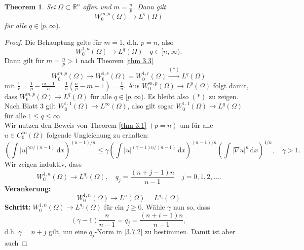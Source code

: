 \documentclass[
paper=a4,
bibtotocnumbered,
liststotocnumbered,
tablecaptionabove,
pointlessnumbers,
twoside,
openright,
10pt
]
{report}
\newtheorem{thm}{Theorem}[chapter]
\theoremstyle{definition}
\numberwithin{equation}{chapter}
\begin{document}
\begin{thm}\label{3.7}
 Sei $\Omega\subset \mathbb R^n$ offen und $m=\frac{n}{p}$. Dann gilt
 \begin{equation}
  W_0^{m,p}(\Omega) \to L^q(\Omega)
 \end{equation}
 für alle $q\in [p,\infty)$.
\end{thm}
\begin{proof}
 Die Behauptung gelte für $m=1$, d.h. $p=n$, also
 \begin{equation}\label{3.7.1}
  W_0^{1,n}(\Omega) \to L^q(\Omega)\quad q \in [n,\infty).
 \end{equation}
Dann gilt für $m=\frac{n}{p}>1$ nach Theorem \ref{thm 3.3}
\begin{equation}
 W_0^{m,p}(\Omega) \to W_0^{1,r}(\Omega) = W_0^{1,r}(\Omega)  \overset{(*)}\rightarrow L^q(\Omega)
\end{equation}
mit $\frac{1}{r} = \frac{1}{p} - \frac{m-1}{n} = \frac{1}{n} \left ( \frac{n}{p} -m+1 \right )= \frac{1}{n}$.
Aus $W_0^{m,p}(\Omega) {\rightarrow} L^p(\Omega)$ folgt damit, dass $W_0^{m,p}(\Omega) \rightarrow L^q(\Omega)$ für alle $q \in [p,\infty)$. 
Es bleibt also $(*)$ zu zeigen. Nach Blatt 3 gilt $W_0^{1,1}(\Omega) \rightarrow L^{\infty}(\Omega)$, also gilt sogar $W_0^{1,1}(\Omega) \rightarrow L^{q}(\Omega)$ für alle $1 \leq q \leq \infty$.
\\ Wir nutzen den Beweis von Theorem \ref{thm 3.1} $(p=n)$ um für alle $u \in C_0^\infty(\Omega)$ folgende Ungleichung zu erhalten:
\begin{equation}\label{3.7.2}
 \left ( \int |u|^{\gamma n/(n-1)} \, \mathrm dx \right )^{(n-1)/n} \le \gamma \left ( \int |u|^{(\gamma-1)n/(n-1)}\, \mathrm dx\right )^{(n-1)/n} \left(\int |\nabla u|^n \, \mathrm dx\right)^{1/n}, \quad \gamma>1.
\end{equation}
Wir zeigen induktiv, dass
\begin{equation}
 W_0^{1,n}(\Omega) \to L^{q_j}(\Omega), \quad q_j = \frac{(n+j-1)n}{n-1}\quad j=0,1,2,\ldots.
\end{equation}
\textbf{Verankerung:} 
\begin{equation}
 W_0^{1,n}(\Omega) \to L^n(\Omega) = L^{q_0}(\Omega)
\end{equation}
\textbf{Schritt:} $W_0^{1,n}(\Omega) \to L^{q_j}(\Omega)$ für ein $ j\ge 0$. Wähle $\gamma$ nun so, dass 
\begin{equation}
 (\gamma-1) \frac{n}{n-1} = q_j = \frac{(n+i-1)n}{n-1}, 
\end{equation}
d.h. $\gamma=n+j$ gilt, um eine $q_j$-Norm in \eqref{3.7.2} zu bestimmen. Damit ist aber auch

\end{proof}
\end{document}
